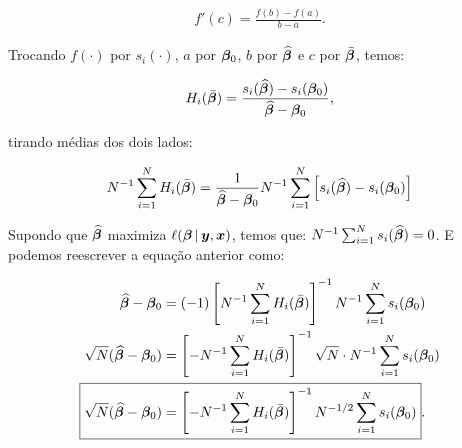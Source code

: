 \documentclass[11pt, oneside, a4paper, article]{article}
\numberwithin{equation}{section}
\begin{document}
\begin{description}
\vspace{-1 em}
\begin{align*}
	f'(c) = \frac{f(b) - f(a)}{b - a}.
\end{align*}

\vspace{1 em}
\begin{center}
\end{center}
\vspace{1 em}

Trocando 
$f(\cdot)$ por $s_{i}(\cdot)$, 
$a$ por $\boldsymbol{\beta}_{0}$, 
$b$ por $\widehat{\boldsymbol{\beta}}$ e
$c$ por $\bar{\boldsymbol{\beta}}$,
temos:

\vspace{-1 em}
\begin{align*}
H_{i} ( \bar{\boldsymbol{\beta}} ) =
\frac{s_{i}( \widehat{\boldsymbol{\beta}} ) - s_{i}( \boldsymbol{\beta}_{0} )}{\widehat{\boldsymbol{\beta}} - \boldsymbol{\beta}_{0}},
\end{align*}

\noindent
tirando médias dos dois lados:

\vspace{-1 em}
\begin{align*}
N^{-1} \sum_{i=1}^{N} 
H_{i} ( \bar{\boldsymbol{\beta}} ) 
=
\frac{1}{\widehat{\boldsymbol{\beta}} - \boldsymbol{\beta}_{0}}
N^{-1} \sum_{i=1}^{N} 
\left[ 
s_{i}( \widehat{\boldsymbol{\beta}} ) - s_{i}( \boldsymbol{\beta}_{0} )
\right]
\end{align*}

Supondo que
$\widehat{\boldsymbol{\beta}}$
maximiza
$\ell (\boldsymbol{\beta} \, | \, \boldsymbol{y}, \boldsymbol{x})$,
temos que:
$N^{-1} \sum_{i=1}^{N} s_{i}(\widehat{\boldsymbol{\beta}}) = 0$.
E podemos reescrever a equação anterior como:

\vspace{-1 em}
\begin{align*}
\widehat{\betavec} - \betavec_{0}
&=
(-1)
\left[ N^{-1} \sum_{i=1}^{N} H_{i} ( \bar{\betavec} ) \right]^{-1}
N^{-1} \sum_{i=1}^{N} s_{i}( \betavec_{0} ) 
\\
\sqrt{N} ( \widehat{\betavec} - \betavec_{0} )
&=
\left[
- N^{-1} \sum_{i=1}^{N} H_{i} ( \bar{\betavec} )
\right]^{-1}
\sqrt{N} \cdot N^{-1} \sum_{i=1}^{N} s_{i}( \betavec_{0} ) 
\\
\Aboxed{
\sqrt{N} ( \widehat{\betavec} - \betavec_{0} )
&=
\left[
- N^{-1} \sum_{i=1}^{N} H_{i} ( \bar{\betavec} )
\right]^{-1}
N^{-1/2} \sum_{i=1}^{N} s_{i}( \betavec_{0} ) }.
\end{align*}


\end{description}
\end{document}
